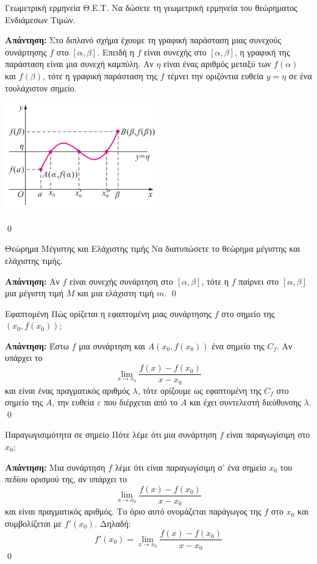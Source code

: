 \documentclass[a4paper, 12pt]{article}
\renewenvironment{proof}[1][\textbf{Απάντηση}]{%
  \par\noindent\textbf{#1:} \rmfamily}{\qed\par}
\begin{document}
\begin{theorem}{Γεωμετρική ερμηνεία Θ.Ε.Τ.}
  Να δώσετε τη γεωμετρική ερμηνεία του θεώρηματος Ενδιάμεσων Τιμών.
\end{theorem}
\begin{proof}
  Στο διπλανό σχήμα έχουμε τη γραφική παράσταση μιας συνεχούς συνάρτησης $f$ στο $[α, β]$. Επειδή η $f$ είναι συνεχής στο $[α, β]$, η γραφική της παράσταση είναι μια συνεχή καμπύλη. Αν $η$ είναι ένας αριθμός μεταξύ των $f(α)$ και $f(β)$, τότε η γραφική παράσταση της $f$ τέμνει την οριζόντια ευθεία $y = η$ σε ένα τουλάχιστον σημείο.
  \begin{center}
    \includegraphics[width=0.5\textwidth]{images/geoBolzano2}
  \end{center}
\end{proof}

\begin{theorem}{Θεώρημα Μέγιστης και Ελάχιστης τιμής}
  Να διατυπώσετε το θεώρημα μέγιστης και ελάχιστης τιμής.
\end{theorem}
\begin{proof}
  Αν $f$ είναι συνεχής συνάρτηση στο $[α, β]$, τότε η $f$ παίρνει στο $[α, β]$ μια μέγιστη τιμή $Μ$ και μια ελάχιστη τιμή $m$.
\end{proof}

\begin{theorem}{Εφαπτομένη}
  Πώς ορίζεται η εφαπτομένη μιας συνάρτησης $f$ στο σημείο της $(x_0, f(x_0))$;
\end{theorem}
\begin{proof}
  Έστω $f$ μια συνάρτηση και $Α(x_0, f( x_0))$ ένα σημείο της $C_f$. Αν υπάρχει το
  $$\lim_{x \to x_0} \dfrac{f(x) - f(x_0)}{x - x_0}$$
  και είναι ένας πραγματικός αριθμός $λ$, τότε ορίζουμε ως εφαπτομένη της $C_f$ στο σημείο της $A$, την ευθεία $ε$ που διέρχεται από το $A$ και έχει συντελεστή διεύθυνσης $λ$.
\end{proof}

\begin{theorem}{Παραγωγισιμότητα σε σημείο}
  Πότε λέμε ότι μια συνάρτηση $f$ είναι παραγωγίσιμη στο $x_0$;
\end{theorem}
\begin{proof}
  Μια συνάρτηση $f$ λέμε ότι είναι παραγωγίσιμη σ’ ένα σημείο $x_0$ του πεδίου ορισμού της, αν υπάρχει το
  $$\lim_{x \to x_0} \dfrac{f(x) - f(x_0)}{x - x_0}$$
  και είναι πραγματικός αριθμός. Το όριο αυτό ονομάζεται παράγωγος της $f$ στο $x_0$ και συμβολίζεται με $f'(x_0)$.
  Δηλαδή:
  $$f'(x_0) = \lim_{x \to x_0} \dfrac{f(x) - f(x_0)}{x - x_0}$$
\end{proof}
\end{document}
